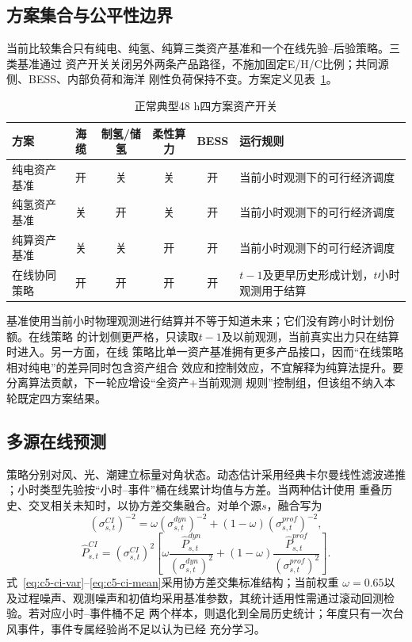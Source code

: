 \subsection{方案集合与公平性边界}

当前比较集合只有纯电、纯氢、纯算三类资产基准和一个在线先验--后验策略。三类基准通过
资产开关关闭另外两条产品路径，不施加固定E/H/C比例；共同源侧、BESS、内部负荷和海洋
刚性负荷保持不变。方案定义见表~\ref{tab:c5-strategy-def}。

\begin{table}[htbp]
\centering
\caption{正常典型48 h四方案资产开关}
\label{tab:c5-strategy-def}
\begin{tabularx}{\textwidth}{p{2.6cm}ccccX}
\toprule
方案 & 海缆 & 制氢/储氢 & 柔性算力 & BESS & 运行规则\\
\midrule
纯电资产基准 & 开 & 关 & 关 & 开 & 当前小时观测下的可行经济调度\\
纯氢资产基准 & 关 & 开 & 关 & 开 & 当前小时观测下的可行经济调度\\
纯算资产基准 & 关 & 关 & 开 & 开 & 当前小时观测下的可行经济调度\\
在线协同策略 & 开 & 开 & 开 & 开 & $t-1$及更早历史形成计划，$t$小时观测用于结算\\
\bottomrule
\end{tabularx}
\end{table}

基准使用当前小时物理观测进行结算并不等于知道未来；它们没有跨小时计划份额。在线策略
的计划侧更严格，只读取$t-1$及以前观测，当前真实出力只在结算时进入。另一方面，在线
策略比单一资产基准拥有更多产品接口，因而“在线策略相对纯电”的差异同时包含资产组合
效应和控制效应，不宜解释为纯算法提升。要分离算法贡献，下一轮应增设“全资产+当前观测
规则”控制组，但该组不纳入本轮既定四方案结果。

\subsection{多源在线预测}

策略分别对风、光、潮建立标量对角状态。动态估计采用经典卡尔曼线性滤波递推
\cite{kalman1960}；小时类型先验按“小时--事件”桶在线累计均值与方差。当两种估计使用
重叠历史、交叉相关未知时，以协方差交集融合\cite{julier1997ci}。对单个源$s$，融合写为
\begin{equation}
\left(\sigma_{s,t}^{CI}\right)^{-2}
=\omega\left(\sigma_{s,t}^{dyn}\right)^{-2}
+(1-\omega)\left(\sigma_{s,t}^{prof}\right)^{-2},
\label{eq:c5-ci-var}
\end{equation}
\begin{equation}
\widehat P_{s,t}^{CI}=\left(\sigma_{s,t}^{CI}\right)^2
\left[
\omega\frac{\widehat P_{s,t}^{dyn}}{(\sigma_{s,t}^{dyn})^2}
+(1-\omega)\frac{\widehat P_{s,t}^{prof}}{(\sigma_{s,t}^{prof})^2}
\right].
\label{eq:c5-ci-mean}
\end{equation}
式~\eqref{eq:c5-ci-var}--\eqref{eq:c5-ci-mean}采用协方差交集标准结构；当前权重
$\omega=0.65$以及过程噪声、观测噪声和初值均采用基准参数，其统计适用性需通过滚动回测检验。若对应小时--事件桶不足
两个样本，则退化到全局历史统计；年度只有一次台风事件，事件专属经验尚不足以认为已经
充分学习。

